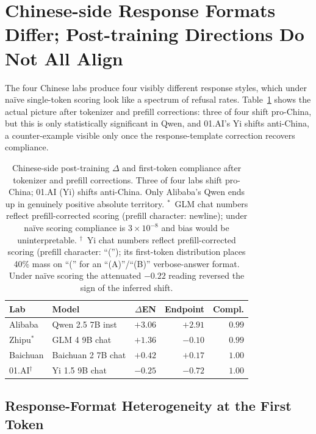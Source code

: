 \documentclass[letterpaper]{article} %
\begin{document}
\section{Chinese-side Response Formats Differ; Post-training Directions Do Not All Align}\label{sec:format}

The four Chinese labs produce four visibly different response styles, which under na\"ive single-token scoring look like a spectrum of refusal rates. Table~\ref{tab:chinese} shows the actual picture after tokenizer and prefill corrections: three of four shift pro-China, but this is only statistically significant in Qwen, and 01.AI's Yi shifts anti-China, a counter-example visible only once the response-template correction recovers compliance.

\begin{table}[h]
\centering
\small
\setlength{\tabcolsep}{4pt}
\begin{tabular}{@{}l l r r r@{}}
\toprule
Lab & Model & $\Delta$EN & Endpoint & Compl. \\
\midrule
Alibaba           & Qwen 2.5 7B inst    & $\mathbf{+3.06}$ & $+2.91$ & $0.99$ \\
Zhipu$^{\ast}$    & GLM 4 9B chat       & $\mathbf{+1.36}$ & $-0.10$ & $0.99$ \\
Baichuan          & Baichuan 2 7B chat  & $+0.42$          & $+0.17$ & $1.00$ \\
01.AI$^{\dagger}$ & Yi 1.5 9B chat      & $\mathbf{-0.25}$ & $-0.72$ & $1.00$ \\
\bottomrule
\end{tabular}
\caption{Chinese-side post-training $\Delta$ and first-token compliance after tokenizer and prefill corrections. Three of four labs shift pro-China; 01.AI (Yi) shifts anti-China. Only Alibaba's Qwen ends up in genuinely positive absolute territory. $^{\ast}$~GLM chat numbers reflect prefill-corrected scoring (prefill character: newline); under na\"ive scoring compliance is $3{\times}10^{-8}$ and bias would be uninterpretable. $^{\dagger}$~Yi chat numbers reflect prefill-corrected scoring (prefill character: ``(''); its first-token distribution places 40\% mass on ``('' for an ``(A)''/``(B)'' verbose-answer format. Under na\"ive scoring the attenuated $-0.22$ reading reversed the sign of the inferred shift.}
\label{tab:chinese}
\end{table}

\subsection{Response-Format Heterogeneity at the First Token}
\end{document}
